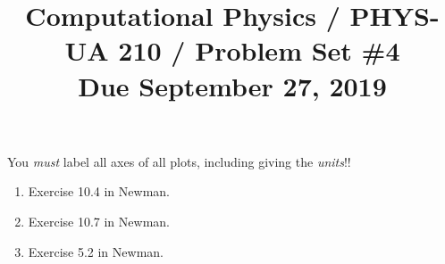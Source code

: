\documentclass[11pt, preprint]{aastex}
\begin{document}
\title{\bf Computational Physics / PHYS-UA 210 / Problem Set \#4
\\ Due September 27, 2019 }

You {\it must} label all axes of all plots, including giving the {\it
  units}!!

\begin{enumerate}
  \item Exercise 10.4 in Newman.
  \item Exercise 10.7 in Newman.
  \item Exercise 5.2 in Newman.

\end{enumerate}
\end{document}
